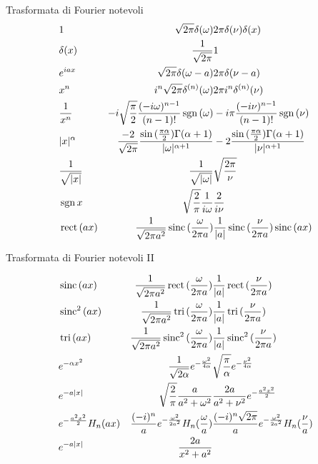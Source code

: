 \begin{wordonframe}{Trasformata di Fourier notevoli}
\begin{align*}
& 1 & \sqrt{2\pi}\delta(\omega) & 2\pi\delta(\nu)\delta(x)\\
& \delta(x) & \frac{1}{\sqrt{2\pi}} & 1\\
& e^{iax} & \sqrt{2\pi}\delta(\omega-a) & 2\pi\delta(\nu-a)\\
& x^n & i^n\sqrt{2\pi}\delta^{(n)}(\omega) & 2\pi i^n\delta^{(n)}(\nu)\\
& \frac{1}{x^n} & -i\sqrt{\frac{\pi}{2}}\frac{(-i\omega)^{n-1}}{(n-1)!}\operatorname{sgn}{(\omega)} & -i\pi\frac{(-i\nu)^{n-1}}{(n-1)!}\operatorname{sgn}{(\nu)}\\
& |x|^{\alpha} & \frac{-2}{\sqrt{2\pi}}\frac{\sin{(\frac{\pi\alpha}{2})}\Gamma(\alpha+1)}{|\omega|^{\alpha+1}} & -2\frac{\sin{(\frac{\pi\alpha}{2})}\Gamma(\alpha+1)}{|\nu|^{\alpha+1}}\\
& \frac{1}{\sqrt{|x|}} & \frac{1}{\sqrt{|\omega|}} & \sqrt{\frac{2\pi}{\nu}}\\
& \operatorname{sgn}{x} & \sqrt{\frac{2}{\pi}}\frac{1}{i\omega} & \frac{2}{i\nu}\\
& \operatorname{rect}{(ax)} & \frac{1}{\sqrt{2\pi a^2}}\operatorname{sinc}{(\frac{\omega}{2\pi a})} &  \frac{1}{|a|}\operatorname{sinc}{(\frac{\nu}{2\pi a})}\operatorname{sinc}{(ax)}\\
\end{align*}

\end{wordonframe}

\begin{wordonframe}{Trasformata di Fourier notevoli II}

\begin{align*}
&\operatorname{sinc}{(ax)} & \frac{1}{\sqrt{2\pi a^2}}\operatorname{rect}{(\frac{\omega}{2\pi a})} &  \frac{1}{|a|}\operatorname{rect}{(\frac{\nu}{2\pi a})}\\
&\operatorname{sinc}^2{(ax)} & \frac{1}{\sqrt{2\pi a^2}}\operatorname{tri}{(\frac{\omega}{2\pi a})} &  \frac{1}{|a|}\operatorname{tri}{(\frac{\nu}{2\pi a})}\\
&\operatorname{tri}{(ax)} & \frac{1}{\sqrt{2\pi a^2}}\operatorname{sinc}^2{(\frac{\omega}{2\pi a})} &  \frac{1}{|a|}\operatorname{sinc}^2{(\frac{\nu}{2\pi a})}\\
&e^{-\alpha x^2} & \frac{1}{\sqrt{2\alpha}}e^{-\frac{\omega^2}{4\alpha}} & \sqrt{\frac{\pi}{\alpha}}e^{-\frac{\nu^2}{4\alpha}}\\
&e^{-a|x|} & \sqrt{\frac{2}{\pi}}\frac{a}{a^2+\omega^2} & \frac{2a}{a^2+\nu^2}e^{-\frac{a^2x^2}{2}}\\
&e^{-\frac{a^2x^2}{2}}H_n(ax) & \frac{(-i)^n}{a}e^{-\frac{\omega^2}{2a^2}}H_n(\frac{\omega}{a}) & \frac{(-i)^n\sqrt{2\pi}}{a}e^{-\frac{\omega^2}{2a^2}}H_n(\frac{\nu}{a})\\
&e^{-a|x|} & \frac{2a}{x^2+a^2}
\end{align*}
\end{wordonframe}

